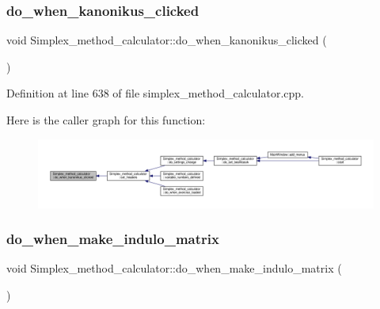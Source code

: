 \subsubsection{\texorpdfstring{do\+\_\+when\+\_\+kanonikus\+\_\+clicked}{do\_when\_kanonikus\_clicked}}
{\footnotesize\ttfamily void Simplex\+\_\+method\+\_\+calculator\+::do\+\_\+when\+\_\+kanonikus\+\_\+clicked (\begin{DoxyParamCaption}{ }\end{DoxyParamCaption})\hspace{0.3cm}{\ttfamily [slot]}}



Definition at line 638 of file simplex\+\_\+method\+\_\+calculator.\+cpp.

Here is the caller graph for this function\+:\nopagebreak
\begin{figure}[H]
\begin{center}
\leavevmode
\includegraphics[width=350pt]{classSimplex__method__calculator_a249c2881a8b5853cdc8b53d74dbae50d_icgraph}
\end{center}
\end{figure}
\mbox{\label{classSimplex__method__calculator_a1382f7059e04318ab470943eafc9ea91}} 
\subsubsection{\texorpdfstring{do\+\_\+when\+\_\+make\+\_\+indulo\+\_\+matrix}{do\_when\_make\_indulo\_matrix}}
{\footnotesize\ttfamily void Simplex\+\_\+method\+\_\+calculator\+::do\+\_\+when\+\_\+make\+\_\+indulo\+\_\+matrix (\begin{DoxyParamCaption}{ }\end{DoxyParamCaption})\hspace{0.3cm}{\ttfamily [slot]}}



